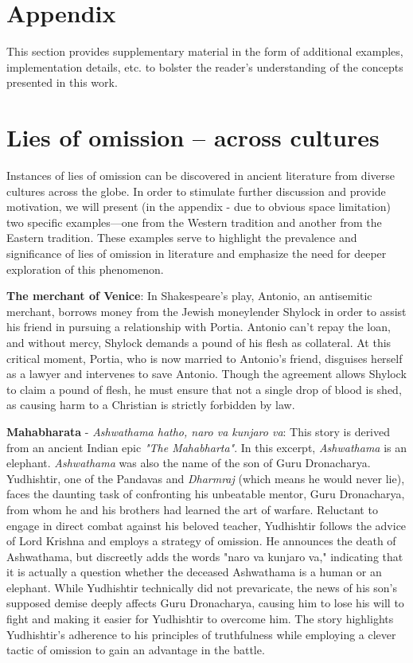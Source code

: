 \newpage
\onecolumn
\appendix
\renewcommand{\thesubsection}{\Alph{section}.\arabic{subsection}}
\renewcommand{\thesection}{\Alph{section}}
\setcounter{section}{0}

\section*{Appendix}\label{sec:appendix}
This section provides supplementary material in the form of additional examples, implementation details, etc. to bolster the reader's understanding of the concepts presented in this work.

\section{Lies of omission -- across cultures}\label{sec:app-A}
Instances of lies of omission can be discovered in ancient literature from diverse cultures across the globe. In order to stimulate further discussion and provide motivation, we will present (in the appendix - due to obvious space limitation) two specific examples—one from the Western tradition and another from the Eastern tradition. These examples serve to highlight the prevalence and significance of lies of omission in literature and emphasize the need for deeper exploration of this phenomenon.

\noindent
\textbf{The merchant of Venice}: In Shakespeare's play, Antonio, an antisemitic merchant, borrows money from the Jewish moneylender Shylock in order to assist his friend in pursuing a relationship with Portia. Antonio can't repay the loan, and without mercy, Shylock demands a pound of his flesh as collateral. At this critical moment, Portia, who is now married to Antonio's friend, disguises herself as a lawyer and intervenes to save Antonio. Though the agreement allows Shylock to claim a pound of flesh, he must ensure that not a single drop of blood is shed, as causing harm to a Christian is strictly forbidden by law.

\noindent
\textbf{Mahabharata} - \emph{Ashwathama hatho, naro va kunjaro va}: This story is derived from an ancient Indian epic \emph{"The Mahabharta"}. In this excerpt, \emph{Ashwathama} is an elephant. \emph{Ashwathama} was also the name of the son of Guru Dronacharya. Yudhishtir, one of the Pandavas and \emph{Dharmraj} (which means he would never lie), faces the daunting task of confronting his unbeatable mentor, Guru Dronacharya, from whom he and his brothers had learned the art of warfare. Reluctant to engage in direct combat against his beloved teacher, Yudhishtir follows the advice of Lord Krishna and employs a strategy of omission. He announces the death of Ashwathama, but discreetly adds the words "naro va kunjaro va," indicating that it is actually a question whether the deceased Ashwathama is a human or an elephant. While Yudhishtir technically did not prevaricate, the news of his son's supposed demise deeply affects Guru Dronacharya, causing him to lose his will to fight and making it easier for Yudhishtir to overcome him. The story highlights Yudhishtir's adherence to his principles of truthfulness while employing a clever tactic of omission to gain an advantage in the battle.

